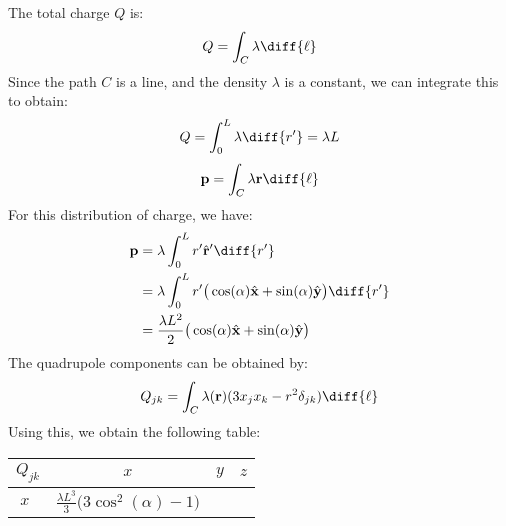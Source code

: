 \documentclass[crop=false,class=book,oneside]{standalone}
\begin{document}
            \begin{solution}
                The total charge $Q$ is:
                \begin{equation}
                    Q=\int_{C}\lambda\diff{\ell}
                \end{equation}
                Since the path $C$ is a line, and the density $\lambda$
                is a constant, we can integrate this to obtain:
                \begin{equation}
                    Q=\int_{0}^{L}\lambda\diff{r'}=\lambda{L}
                \end{equation}
                \begin{equation}
                    \mathbf{p}=\int_{C}\lambda\mathbf{r}\diff{\ell}
                \end{equation}
                For this distribution of charge, we have:
                \begin{subequations}
                    \begin{align}
                        \mathbf{p}&=
                            \lambda\int_{0}^{L}r'\hat{\mathbf{r}}'\diff{r'}\\
                        &=\lambda\int_{0}^{L}r'
                            \big(\cos(\alpha)\hat{\mathbf{x}}+
                                 \sin(\alpha)\hat{\mathbf{y}}\big)\diff{r'}\\
                        &=\frac{\lambda{L}^{2}}{2}
                            \big(\cos(\alpha)\hat{\mathbf{x}}+
                                 \sin(\alpha)\hat{\mathbf{y}}\big)
                    \end{align}
                \end{subequations}
                The quadrupole components can be obtained by:
                \begin{equation}
                    Q_{jk}=\int_{C}\lambda(\mathbf{r})
                        (3x_{j}x_{k}-r^{2}\delta_{jk})\diff{\ell}
                \end{equation}
                Using this, we obtain the following table:
                \begin{table}[H]
                    \centering
                    \captionsetup{type=table}
                    \begin{tabular}{|c|c|c|c|}
                        \hline
                        $Q_{jk}$&$x$&$y$&$z$\\
                        \hline
                        $x\phantom{\bigg(}$&
                        $\frac{\lambda{L}^3}{3}\big(3\cos^{2}(\alpha)-1\big)$&

\end{tabular}
\end{table}
\end{solution}
\end{document}
